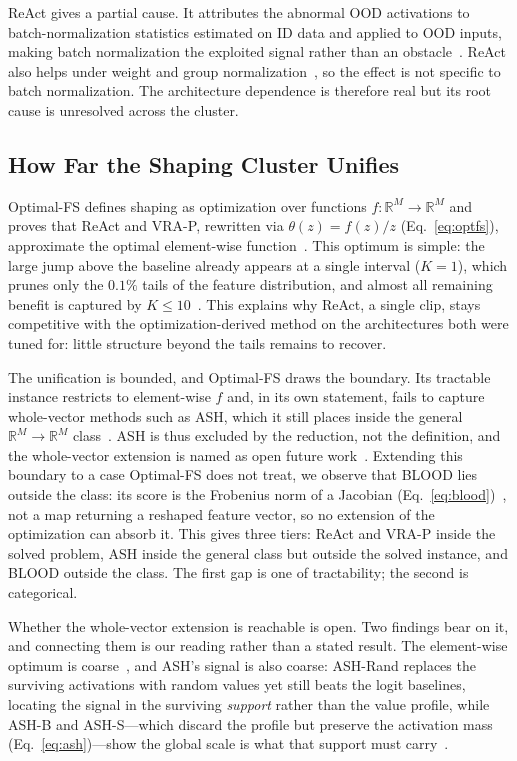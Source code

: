 \documentclass[a4paper]{article}
\begin{document}
ReAct gives a partial cause. It attributes the abnormal OOD activations to
batch-normalization statistics estimated on ID data and applied to OOD inputs, making
batch normalization the exploited signal rather than an obstacle~\citep{react}. ReAct
also helps under weight and group normalization~\citep{react}, so the effect is not
specific to batch normalization. The architecture dependence is therefore real but its
root cause is unresolved across the cluster.

\subsection{How Far the Shaping Cluster Unifies}
\label{subsec:disc-unify}

Optimal-FS defines shaping as optimization over functions
$f : \mathbb{R}^{M} \to \mathbb{R}^{M}$ and proves that ReAct and VRA-P, rewritten via
$\theta(z) = f(z)/z$ (Eq.~\ref{eq:optfs}), approximate the optimal element-wise
function~\citep{optimalfs}.
This optimum is simple: the large jump above the baseline already appears at a
single interval ($K=1$), which prunes only the $0.1\%$ tails of the feature
distribution, and almost all remaining benefit is captured by $K \leq
10$~\citep{optimalfs}. This explains why ReAct, a single clip, stays competitive
with the optimization-derived method on the architectures both were tuned for:
little structure beyond the tails remains to recover.

The unification is bounded, and Optimal-FS draws the boundary. Its tractable instance
restricts to element-wise $f$ and, in its own statement, fails to capture whole-vector
methods such as ASH, which it still places inside the general
$\mathbb{R}^{M} \to \mathbb{R}^{M}$ class~\citep{optimalfs}. ASH is thus excluded by the
reduction, not the definition, and the whole-vector extension is named as open future
work~\citep{optimalfs}. Extending this boundary to a case Optimal-FS does not treat, we
observe that BLOOD lies outside the class: its score is the Frobenius norm of a
Jacobian (Eq.~\ref{eq:blood})~\citep{blood}, not a map returning a reshaped feature
vector, so no extension of the optimization can absorb it. This gives three tiers: ReAct and VRA-P inside the solved
problem, ASH inside the general class but outside the solved instance, and BLOOD outside
the class. The first gap is one of tractability; the second is categorical.

Whether the whole-vector extension is reachable is open. Two findings bear on it, and
connecting them is our reading rather than a stated result. The element-wise optimum is coarse~\citep{optimalfs}, and ASH's signal is also
coarse: ASH-Rand replaces the surviving activations with random values yet still
beats the logit baselines, locating the signal in the surviving \emph{support}
rather than the value profile, while ASH-B and ASH-S---which discard the profile
but preserve the activation mass (Eq.~\ref{eq:ash})---show the global scale is what that support
must carry~\citep{ash}.
\end{document}
